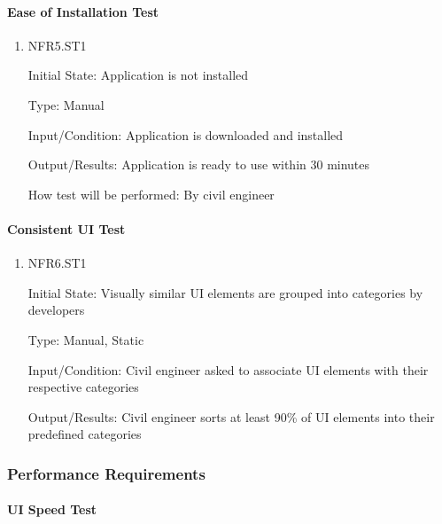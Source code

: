 \documentclass[12pt, titlepage]{article}
\begin{document}
\paragraph{Ease of Installation Test}

\begin{enumerate}

\item{NFR5.ST1\\}

Initial State: Application is not installed

Type: Manual

Input/Condition: Application is downloaded and installed

Output/Results: Application is ready to use within 30 minutes

How test will be performed: By civil engineer

\end{enumerate}

\paragraph{Consistent UI Test}

\begin{enumerate}

\item{NFR6.ST1\\}

Initial State: Visually similar UI elements are grouped into categories by developers

Type: Manual, Static

Input/Condition: Civil engineer asked to associate UI elements with their respective categories

Output/Results: Civil engineer sorts at least 90\% of UI elements into their predefined categories

\end{enumerate}

\subsubsection{Performance Requirements}

\paragraph{UI Speed Test}
\end{document}
